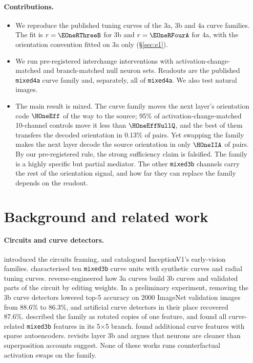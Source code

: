 \documentclass[11pt]{article}
\begin{document}
\paragraph{Contributions.}
\begin{itemize}
\item We reproduce the published tuning curves of the 3a, 3b and 4a curve families. The fit is $r=\EOneRThreeB$ for 3b and $r=\EOneRFourA$ for 4a, with the orientation convention fitted on 3a only (\S\ref{sec:e1}).
\item We run pre-registered interchange interventions with activation-change-matched and branch-matched null neuron sets. Readouts are the published \texttt{mixed4a} curve family and, separately, all of \texttt{mixed4a}. We also test natural images.
\item The main result is mixed. The curve family moves the next layer's orientation code $\HOneEff$ of the way to the source; 95\% of activation-change-matched 10-channel controls move it less than $\HOneEffNullQ$, and the best of them transfers the decoded orientation in 0.13\% of pairs. Yet swapping the family makes the next layer decode the source orientation in only $\HOneIIA$ of pairs. By our pre-registered rule, the strong sufficiency claim is falsified. The family is a highly specific but partial mediator. The other \texttt{mixed3b} channels carry the rest of the orientation signal, and how far they can replace the family depends on the readout.
\end{itemize}

\section{Background and related work}
\paragraph{Circuits and curve detectors.}
\citet{olah2020zoom} introduced the circuits framing, and \citet{olah2020early} catalogued InceptionV1's early-vision families. \citet{cammarata2020curve} characterised ten \texttt{mixed3b} curve units with synthetic curves and radial tuning curves. \citet{cammarata2021circuits} reverse-engineered how 3a curves build 3b curves and validated parts of the circuit by editing weights. In a preliminary experiment, removing the 3b curve detectors lowered top-5 accuracy on 2000 ImageNet validation images from 88.6\% to 86.3\%, and artificial curve detectors in their place recovered 87.6\%. \citet{olah2020equivariance} described the family as rotated copies of one feature, and \citet{voss2021branch} found all curve-related \texttt{mixed3b} features in its 5$\times$5 branch. \citet{gorton2024missing} found additional curve features with sparse autoencoders. \citet{cammarata2026clean} revisits layer 3b and argues that neurons are cleaner than superposition accounts suggest. None of these works runs counterfactual activation swaps on the family.
\end{document}
